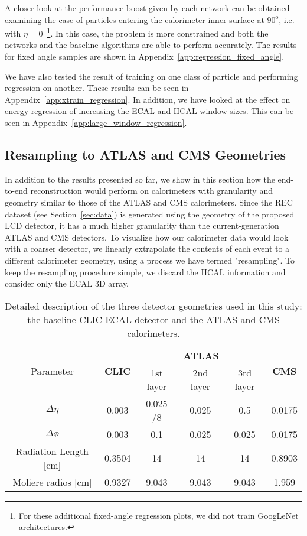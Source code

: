 A closer look at the performance boost given by each network can be obtained examining the case of particles entering the calorimeter inner surface at $90^{\mathrm o}$, i.e. with $\eta=0$~\footnote{For these additional fixed-angle regression plots, we did not train GoogLeNet architectures.}. In this case, the problem is more constrained and both the networks and the baseline algorithms are able to perform accurately. The results for fixed angle samples are shown in Appendix~\ref{app:regression_fixed_angle}.

We have also tested the result of training on one class of particle and performing regression on another. These results can be seen in Appendix~\ref{app:xtrain_regression}. In addition, we have looked at the effect on energy regression of increasing the ECAL and HCAL window sizes. This can be seen in Appendix~\ref{app:large_window_regression}.

\subsection{Resampling to ATLAS and CMS Geometries}\label{sec:resampling}

In addition to the results presented so far, we show in this section how the end-to-end reconstruction would perform on calorimeters with granularity and geometry similar to those of the ATLAS and CMS calorimeters. Since the REC dataset (see Section~\ref{sec:data}) is generated using the geometry of the proposed LCD detector, it has a much higher granularity than the current-generation ATLAS and CMS detectors. To visualize how our calorimeter data would look with a coarser detector, we linearly extrapolate the contents of each event to a different calorimeter geometry, using a process we have termed "resampling". To keep the resampling procedure simple, we discard the HCAL information and consider only the ECAL 3D array.

\begin{table*}[tbp]
\centering
\caption{Detailed description of the three detector geometries used in this study: the baseline CLIC ECAL detector and the ATLAS and CMS calorimeters.\label{tab:resampling_geometry}}
\begin{tabular}{c|c|ccc|c}
\hline
\multirow{2}{*}{Parameter} & \multirow{2}{*}{\textbf{CLIC}} & \multicolumn{3}{c|}{\textbf{ATLAS}} & \multirow{2}{*}{\textbf{CMS}} \\
            &               & 1st layer & 2nd layer & 3rd layer & \\
\hline
$\Delta \eta$         & 0.003  & 0.025 /8 & 0.025 & 0.5   & 0.0175 \\
$\Delta \phi$         & 0.003  & 0.1      & 0.025 & 0.025 & 0.0175 \\
Radiation Length [cm] & 0.3504 & 14       & 14    & 14    & 0.8903 \\
Moliere radios [cm]   & 0.9327 & 9.043    & 9.043 & 9.043 & 1.959  \\
\hline 
\end{tabular}
\end{table*}

